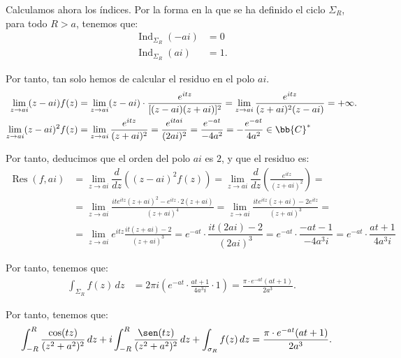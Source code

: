 \documentclass[12pt]{article}
\DeclareMathOperator{\Ind}{Ind}
\DeclareMathOperator{\Res}{Res}
\begin{document}
\begin{ejercicio}[2.5 puntos]
    Calculamos ahora los índices. Por la forma en la que se ha definido el ciclo $\Sigma_R$, para todo $R > a$, tenemos que:
    \begin{align*}
        \Ind_{\Sigma_R}(-ai) &= 0\\
        \Ind_{\Sigma_R}(ai) &= 1.
    \end{align*}

    Por tanto, tan solo hemos de calcular el residuo en el polo $ai$.
    \begin{align*}
        \lim_{z\to ai} (z - ai)f(z) &= \lim_{z\to ai} (z - ai)\cdot \frac{e^{i t z}}{[(z - ai)(z + ai)]^2}
        = \lim_{z\to ai} \frac{e^{i t z}}{(z + ai)^2(z - ai)} = +\infty.\\
        \lim_{z\to ai} (z - ai)^2f(z) &= \lim_{z\to ai} \frac{e^{i t z}}{(z + ai)^2}
        = \frac{e^{i t ai}}{(2ai)^2} = \frac{e^{-at}}{-4a^2} = -\frac{e^{-at}}{4a^2}\in \bb{C}^*
    \end{align*}

    Por tanto, deducimos que el orden del polo $ai$ es $2$, y que el residuo es:
    \begin{align*}
        \Res(f, ai) &= \lim_{z\to ai} \dfrac{d}{dz}\left((z - ai)^2f(z)\right)
        = \lim_{z\to ai} \dfrac{d}{dz}\left(\frac{e^{i t z}}{(z + ai)^2}\right)
        =\\&= \lim_{z\to ai} \frac{i t e^{i t z}(z + ai)^2 - e^{i t z}\cdot 2(z + ai)}{(z + ai)^4}
        = \lim_{z\to ai} \frac{i t e^{i t z}(z + ai) - 2e^{i t z}}{(z + ai)^3}
        =\\&=  \lim_{z\to ai} e^{i t z} \frac{i t (z + ai) - 2}{(z + ai)^3}
        = e^{-at}\cdot \dfrac{i t (2ai) - 2}{(2ai)^3}
        = e^{-at}\cdot \dfrac{-at -1}{-4a^3i}
        = e^{-at}\cdot \dfrac{at+1}{4a^3i}
    \end{align*}

    Por tanto, tenemos que:
    \begin{align*}
        \int_{\Sigma_R} f(z) \, dz &= 2\pi i\left(e^{-at}\cdot \frac{at + 1}{4a^3i} \cdot 1\right)
        = \frac{\pi\cdot e^{-at}(at + 1)}{2a^3}.
    \end{align*}

    Por tanto, tenemos que:
    \begin{align*}
        \int_{-R}^{R} \frac{\cos(t z)}{(z^2 + a^2)^2} \, dz + i\int_{-R}^{R} \frac{\sen(t z)}{(z^2 + a^2)^2} \, dz + \int_{\sigma_R} f(z) \, dz &= \frac{\pi\cdot e^{-at}(at + 1)}{2a^3}.
    \end{align*}


\end{ejercicio}
\end{document}
